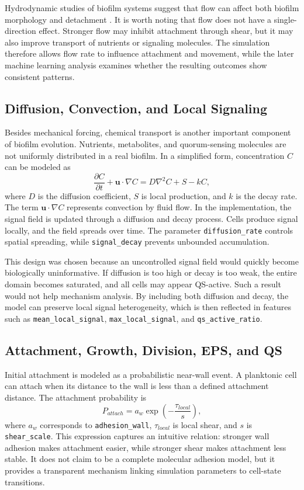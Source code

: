 \documentclass[12pt,a4paper,oneside]{report}
\begin{document}
Hydrodynamic studies of biofilm systems suggest that flow can affect both biofilm morphology and detachment \cite{dynamicflow2022,stoodley1994}. It is worth noting that flow does not have a single-direction effect. Stronger flow may inhibit attachment through shear, but it may also improve transport of nutrients or signaling molecules. The simulation therefore allows flow rate to influence attachment and movement, while the later machine learning analysis examines whether the resulting outcomes show consistent patterns.

\subsection{Diffusion, Convection, and Local Signaling}
Besides mechanical forcing, chemical transport is another important component of biofilm evolution. Nutrients, metabolites, and quorum-sensing molecules are not uniformly distributed in a real biofilm. In a simplified form, concentration \(C\) can be modeled as
\begin{equation}
\frac{\partial C}{\partial t} + \mathbf{u}\cdot\nabla C = D\nabla^2 C + S - kC,
\end{equation}
where \(D\) is the diffusion coefficient, \(S\) is local production, and \(k\) is the decay rate. The term \(\mathbf{u}\cdot\nabla C\) represents convection by fluid flow. In the implementation, the signal field is updated through a diffusion and decay process. Cells produce signal locally, and the field spreads over time. The parameter \texttt{diffusion\_rate} controls spatial spreading, while \texttt{signal\_decay} prevents unbounded accumulation.

This design was chosen because an uncontrolled signal field would quickly become biologically uninformative. If diffusion is too high or decay is too weak, the entire domain becomes saturated, and all cells may appear QS-active. Such a result would not help mechanism analysis. By including both diffusion and decay, the model can preserve local signal heterogeneity, which is then reflected in features such as \texttt{mean\_local\_signal}, \texttt{max\_local\_signal}, and \texttt{qs\_active\_ratio}.

\subsection{Attachment, Growth, Division, EPS, and QS}
Initial attachment is modeled as a probabilistic near-wall event. A planktonic cell can attach when its distance to the wall is less than a defined attachment distance. The attachment probability is
\begin{equation}
P_{attach}=a_w \exp\left(-\frac{\tau_{local}}{s}\right),
\end{equation}
where \(a_w\) corresponds to \texttt{adhesion\_wall}, \(\tau_{local}\) is local shear, and \(s\) is \texttt{shear\_scale}. This expression captures an intuitive relation: stronger wall adhesion makes attachment easier, while stronger shear makes attachment less stable. It does not claim to be a complete molecular adhesion model, but it provides a transparent mechanism linking simulation parameters to cell-state transitions.
\end{document}
